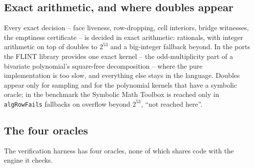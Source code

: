 \documentclass[11pt]{article}
\theoremstyle{definition}
\begin{document}
\subsection{Exact arithmetic, and where doubles appear}

Every exact decision -- face liveness, row-dropping, cell interiors, bridge
witnesses, the emptiness certificate -- is decided in exact arithmetic:
rationals, with integer arithmetic on top of doubles to $2^{53}$ and a
big-integer fallback beyond.
 In the
ports the FLINT library provides one exact kernel -- the odd-multiplicity part
of a bivariate polynomial's square-free decomposition -- where the pure
implementation is too slow, and everything else stays in the language.
 Doubles appear only for
sampling and for the polynomial kernels that have a symbolic oracle; in the
benchmark the Symbolic Math Toolbox is reached only in
\texttt{algRowFails} fallbacks on overflow beyond $2^{53}$, ``not reached here''.

\subsection{The four oracles}

The verification harness has four oracles, none of which shares code with the
engine it checks.
\end{document}
